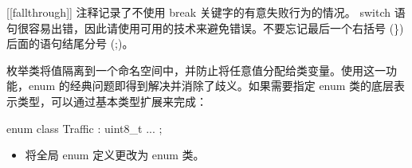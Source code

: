 [[fallthrough]] 注释记录了不使用 break 关键字的有意失败行为的情况。 switch 语句很容易出错，因此请使用可用的技术来避免错误。不要忘记最后一个右括号 (\}) 后面的语句结尾分号 (;)。

枚举类将值隔离到一个命名空间中，并防止将任意值分配给类变量。使用这一功能，enum 的经典问题即得到解决并消除了歧义。如果需要指定 enum 类的底层表示类型，可以通过基本类型扩展来完成：

\begin{cpp}
enum class Traffic : uint8_t {
  ...
};
\end{cpp}


\begin{itemize}
\item
将全局 enum 定义更改为 enum 类。
\end{itemize}
